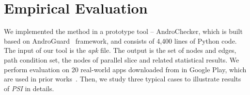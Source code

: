 \section{Empirical Evaluation}
We implemented the method in a prototype tool -- AndroChecker, which is built based on AndroGuard~\cite{new2013androguard} framework, and consists of 4,400 lines of Python code. The input of our tool is the \textit{apk} file. The output is the set of nodes and edges, path condition set, the nodes of parallel slice and related statistical results.
We perform evaluation on 20 real-world apps downloaded from in Google Play, which are used in prior works~\cite{new2015static, new2015window}. %
Then, we study three typical cases to illustrate results of \textit{PSI} in details. 

